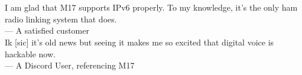 \documentclass[10pt,letterpaper,notitlepage]{article}
\begin{document}
  \section*{}
    \begin{boxA}
    \centering
    I am glad that M17 supports IPv6 properly. To my knowledge, it’s the only ham radio linking system that does.\\
    --- A satisfied customer\\
    \bigskip
    Ik [sic] it’s old news but seeing it makes me so excited that digital voice is hackable
now.\\
    --- A Discord User, referencing M17\\
    \end{boxA}
  \pagebreak
\end{document}
